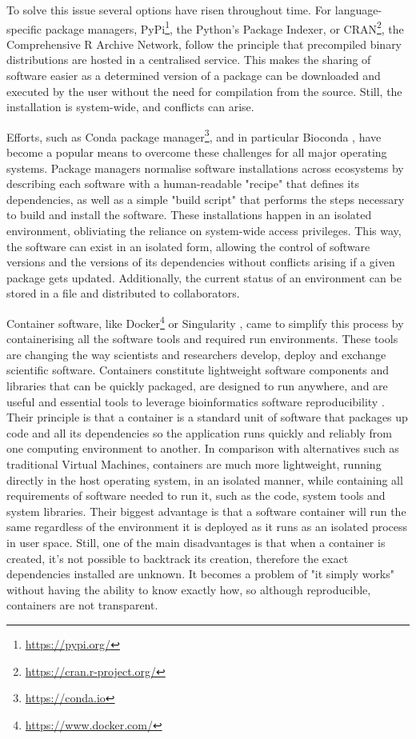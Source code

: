 To solve this issue several options have risen throughout time. For language-specific package managers, PyPi\footnote{\url{https://pypi.org/}}, the Python's Package Indexer, or CRAN\footnote{\url{https://cran.r-project.org/}}, the Comprehensive R Archive Network, follow the principle that precompiled binary distributions are hosted in a centralised service. This makes the sharing of software easier as a determined version of a package can be downloaded and executed by the user without the need for compilation from the source. Still, the installation is system-wide, and conflicts can arise. 

Efforts, such as Conda package manager\footnote{\url{https://conda.io}}, and in particular Bioconda \citep{gruning_bioconda_2018}, have become a popular means to overcome these challenges for all major operating systems. Package managers normalise software installations across ecosystems by describing each software with a human-readable "recipe" that defines its dependencies, as well as a simple "build script" that performs the steps necessary to build and install the software. These installations happen in an isolated environment, obliviating the reliance on system-wide access privileges. This way, the software can exist in an isolated form, allowing the control of software versions and the versions of its dependencies without conflicts arising if a given package gets updated. Additionally, the current status of an environment can be stored in a file and distributed to collaborators. 

Container software, like Docker\footnote{\url{https://www.docker.com/}} or Singularity \citep{kurtzer_singularity_2017}, came to simplify this process by containerising all the software tools and required run environments. These tools are changing the way scientists and researchers develop, deploy and exchange scientific software. Containers constitute lightweight software components and libraries that can be quickly packaged, are designed to run anywhere, and are useful and essential tools to leverage bioinformatics software reproducibility \citep{boettiger_introduction_2015,gruening_recommendations_2019}. Their principle is that a container is a standard unit of software that packages up code and all its dependencies so the application runs quickly and reliably from one computing environment to another. In comparison with alternatives such as traditional Virtual Machines, containers are much more lightweight, running directly in the host operating system, in an isolated manner, while containing all requirements of software needed to run it, such as the code, system tools and system libraries. Their biggest advantage is that a software container will run the same regardless of the environment it is deployed as it runs as an isolated process in user space. Still, one of the main disadvantages is that when a container is created, it's not possible to backtrack its creation, therefore the exact dependencies installed are unknown. It becomes a problem of "it simply works" without having the ability to know exactly how, so although reproducible, containers are not transparent. 

